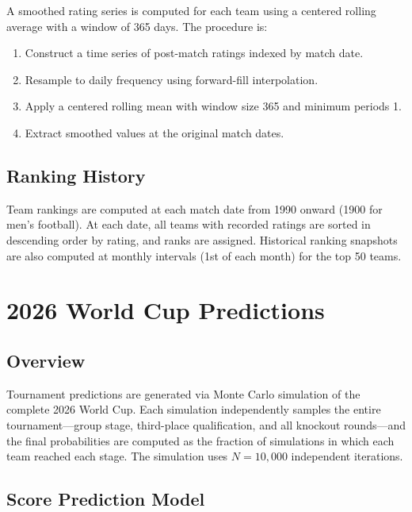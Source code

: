 \documentclass[11pt]{article}
\begin{document}
A smoothed rating series is computed for each team using a centered rolling average with a window of 365 days. The procedure is:
\begin{enumerate}[nosep]
    \item Construct a time series of post-match ratings indexed by match date.
    \item Resample to daily frequency using forward-fill interpolation.
    \item Apply a centered rolling mean with window size 365 and minimum periods 1.
    \item Extract smoothed values at the original match dates.
\end{enumerate}

\subsection{Ranking History}

Team rankings are computed at each match date from 1990 onward (1900 for men's football). At each date, all teams with recorded ratings are sorted in descending order by rating, and ranks are assigned. Historical ranking snapshots are also computed at monthly intervals (1st of each month) for the top 50 teams.

\section{2026 World Cup Predictions}
\label{sec:worldcup}

\subsection{Overview}

Tournament predictions are generated via Monte Carlo simulation of the complete 2026 World Cup. Each simulation independently samples the entire tournament---group stage, third-place qualification, and all knockout rounds---and the final probabilities are computed as the fraction of simulations in which each team reached each stage. The simulation uses $N = 10{,}000$ independent iterations.

\subsection{Score Prediction Model}
\end{document}
